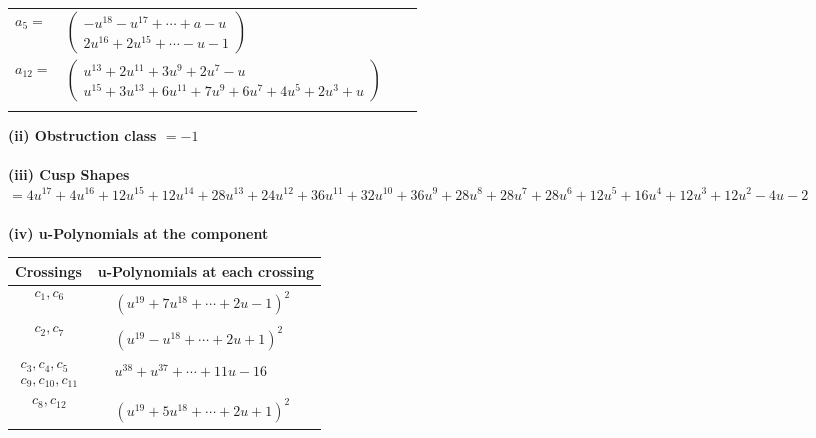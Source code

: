 \documentclass[1p]{elsarticle_modified}
\theoremstyle{definition}
\begin{document}
\begin{tabular}{m{7pt} m{180pt} m{7pt} m{180pt} }
\flushright $a_{5}=$&$\begin{pmatrix}- u^{18}- u^{17}+\cdots+a- u\\2 u^{16}+2 u^{15}+\cdots- u-1\end{pmatrix}$ \\
\flushright $a_{12}=$&$\begin{pmatrix}u^{13}+2 u^{11}+3 u^9+2 u^7- u\\u^{15}+3 u^{13}+6 u^{11}+7 u^9+6 u^7+4 u^5+2 u^3+u\end{pmatrix}$\\&\end{tabular}
\flushleft \textbf{(ii) Obstruction class $= -1$}\\~\\
\flushleft \textbf{(iii) Cusp Shapes $= 4 u^{17}+4 u^{16}+12 u^{15}+12 u^{14}+28 u^{13}+24 u^{12}+36 u^{11}+32 u^{10}+36 u^9+28 u^8+28 u^7+28 u^6+12 u^5+16 u^4+12 u^3+12 u^2-4 u-2$}\\~\\
\newpage\renewcommand{\arraystretch}{1}
\flushleft \textbf{(iv) u-Polynomials at the component}\newline \\
\begin{tabular}{m{50pt}|m{274pt}}
Crossings & \hspace{64pt}u-Polynomials at each crossing \\
\hline $$\begin{aligned}c_{1},c_{6}\end{aligned}$$&$\begin{aligned}
&(u^{19}+7 u^{18}+\cdots+2 u-1)^{2}
\end{aligned}$\\
\hline $$\begin{aligned}c_{2},c_{7}\end{aligned}$$&$\begin{aligned}
&(u^{19}- u^{18}+\cdots+2 u+1)^{2}
\end{aligned}$\\
\hline $$\begin{aligned}c_{3},c_{4},c_{5}\\c_{9},c_{10},c_{11}\end{aligned}$$&$\begin{aligned}
&u^{38}+u^{37}+\cdots+11 u-16
\end{aligned}$\\
\hline $$\begin{aligned}c_{8},c_{12}\end{aligned}$$&$\begin{aligned}
&(u^{19}+5 u^{18}+\cdots+2 u+1)^{2}
\end{aligned}$\\
\hline
\end{tabular}\\~\\
\end{document}
